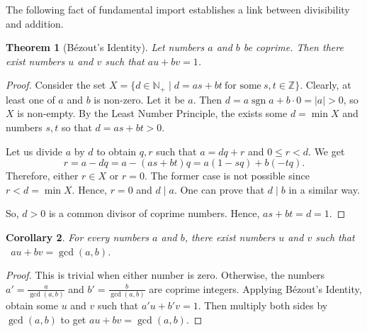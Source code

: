 \documentclass[12pt,notitlepage]{article}
\theoremstyle{plain}
\newtheorem{thm}{Theorem}[section]
\newtheorem{corr}[thm]{Corollary}
\theoremstyle{definition}
\theoremstyle{plain}
\newcommand{\N}{\mathbb{N}}
\newcommand{\Z}{\mathbb{Z}}
\newcommand{\1}{\mathbf{1}}
\newcommand{\0}{\mathbf{0}}
\newcommand{\dvd}{\mathop{\mid}}
\DeclareMathOperator{\sgn}{sgn}
\begin{document}
\noindent The following fact of fundamental import establishes a link between divisibility and addition.
\begin{thm}[B\'ezout's Identity]\label{L5:t1}
Let numbers $a$ and $b$ be coprime. Then there exist numbers $u$ and $v$ such that $a u + b v = 1$.
\end{thm}
\begin{proof}
Consider the set $X = \{ d \in \N_+  \mid  d = a s + b t\ \mbox{for some}\ s, t \in \Z \}$. Clearly, at least one of $a$ and $b$ is non-zero. Let it be $a$. Then $d = a \sgn a + b \cdot 0 = |a| > 0$, so $X$ is non-empty. By the Least Number Principle, the exists some $d = \min X$ and numbers $s,t$ so that $d = a s + b t > 0$.

Let us divide $a$ by $d$ to obtain $q, r$ such that $a = d q + r$ and $0 \leq r < d$. We get
$$r = a - d q = a - (a s + b t) q = a (1 - sq) + b(-tq).$$
Therefore, either $r \in X$ or $r = 0$. The former case is not possible since $r < d = \min X$. Hence, $r = 0$ and $d \dvd a$. One can prove that $d \dvd b$ in a similar way.

So, $d > 0$ is a common divisor of coprime numbers. Hence, $a s + b t = d = 1$.
\end{proof}

\begin{corr}\label{L5:bezout_int}
For every numbers $a$ and $b$, there exist numbers $u$ and $v$ such that \ $a u + b v = \gcd(a,b)$.
\end{corr}
\begin{proof}
This is trivial when either number is zero. Otherwise, the numbers $a' = \frac{a}{\gcd(a, b)}$ and $b' = \frac{b}{\gcd(a, b)}$ are coprime integers. Applying B\'ezout's Identity, obtain some $u$ and $v$ such that $a'u + b'v = 1$. Then multiply both sides by $\gcd(a,b)$ to get $a u + b v = \gcd(a, b)$.
\end{proof}
\end{document}
